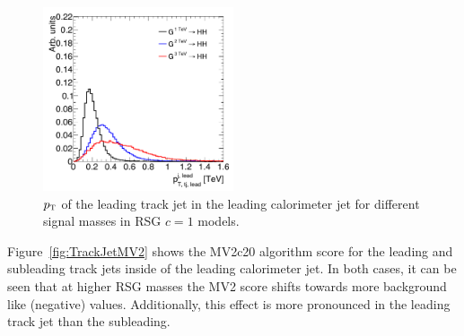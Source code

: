 \begin{figure}[h!]
  \centering
  \captionsetup{justification=centering}

  \includegraphics[width=0.5\textwidth]{figures/TrackJetPt}
  \caption{$p_{\textrm{\footnotesize\sc t}}$ of the leading track jet in the leading calorimeter jet for different signal masses in RSG $c=1$ models.}
  \label{fig:TrackJetPt}
\end{figure}

Figure~\ref{fig:TrackJetMV2} shows the MV2c20 algorithm score for the leading and subleading track jets inside of the leading calorimeter jet. In both cases, it can be seen that at higher RSG masses the MV2 score shifts towards more background like (negative) values. Additionally, this effect is more pronounced in the leading track jet than the subleading. 

